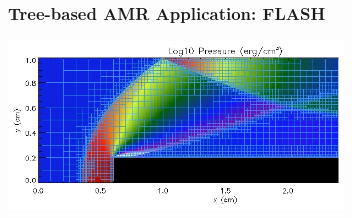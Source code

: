 \begin{frame}[fragile] \frametitle{Tree-based AMR Application: FLASH}
\centerline{\includegraphics[width=3.5in]{paramesh.png}}
\end{frame}
